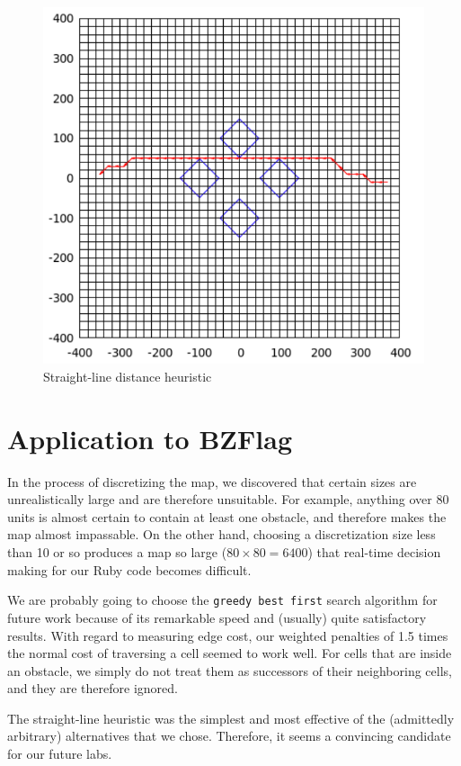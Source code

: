 \begin{figure}\label{fig:straight}
\begin{center}
\includegraphics[width=\textwidth]{heur3.png}
\caption{Straight-line distance heuristic}
\end{center}
\end{figure}


\section{Application to BZFlag}
In the process of discretizing the map, we discovered that certain sizes are unrealistically large and are therefore unsuitable.  For example, anything over 80 units is almost certain to contain at least one obstacle, and therefore makes the map almost impassable.  On the other hand, choosing a discretization size less than 10 or so produces a map so large ($80 \times 80 = 6400$) that real-time decision making for our Ruby code becomes difficult.
\par
We are probably going to choose the \texttt{greedy best first} search algorithm for future work because of its remarkable speed and (usually) quite satisfactory results.  With regard to measuring edge cost, our weighted penalties of 1.5 times the normal cost of traversing a cell seemed to work well.  For cells that are inside an obstacle, we simply do not treat them as successors of their neighboring cells, and they are therefore ignored.
\par
The straight-line heuristic was the simplest and most effective of the (admittedly arbitrary) alternatives that we chose.  Therefore, it seems a convincing candidate for our future labs.

